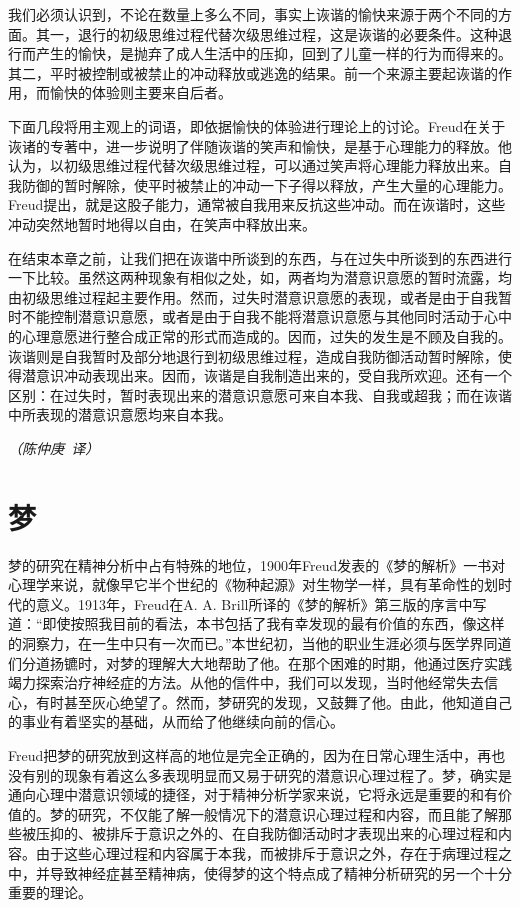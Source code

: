 \documentclass[UTF8,10pt,a4paper,openany]{book}
\newcommand{\signature}[1]{\begin{flushright}\slshape #1\end{flushright}}
\newcommand{\signatureA}{\signature{（陈仲庚~译）}}
\begin{document}
我们必须认识到，不论在数量上多么不同，事实上诙谐的愉快来源于两个不同的方面。其一，退行的初级思维过程代替次级思维过程，这是诙谐的必要条件。这种退行而产生的愉快，是抛弃了成人生活中的压抑，回到了儿童一样的行为而得来的。其二，平时被控制或被禁止的冲动释放或逃逸的结果。前一个来源主要起诙谐的作用，而愉快的体验则主要来自后者。

下面几段将用主观上的词语，即依据愉快的体验进行理论上的讨论。Freud在关于诙诸的专著中，进一步说明了伴随诙谐的笑声和愉快，是基于心理能力的释放。他认为，以初级思维过程代替次级思维过程，可以通过笑声将心理能力释放出来。自我防御的暂时解除，使平时被禁止的冲动一下子得以释放，产生大量的心理能力。Freud提出，就是这股子能力，通常被自我用来反抗这些冲动。而在诙谐时，这些冲动突然地暂时地得以自由，在笑声中释放出来。

在结束本章之前，让我们把在诙谐中所谈到的东西，与在过失中所谈到的东西进行一下比较。虽然这两种现象有相似之处，如，两者均为潜意识意愿的暂时流露，均由初级思维过程起主要作用。然而，过失时潜意识意愿的表现，或者是由于自我暂时不能控制潜意识意愿，或者是由于自我不能将潜意识意愿与其他同时活动于心中的心理意愿进行整合成正常的形式而造成的。因而，过失的发生是不顾及自我的。诙谐则是自我暂时及部分地退行到初级思维过程，造成自我防御活动暂时解除，使得潜意识冲动表现出来。因而，诙谐是自我制造出来的，受自我所欢迎。还有一个区别：在过失时，暂时表现出来的潜意识意愿可来自本我、自我或超我；而在诙谐中所表现的潜意识意愿均来自本我。

\signatureA



\chapter{梦}\label{7}

梦的研究在精神分析中占有特殊的地位，1900年Freud发表的《梦的解析》一书对心理学来说，就像早它半个世纪的《物种起源》对生物学一样，具有革命性的划时代的意义。1913年，Freud在A. A. Brill所译的《梦的解析》第三版的序言中写道：“即使按照我目前的看法，本书包括了我有幸发现的最有价值的东西，像这样的洞察力，在一生中只有一次而已。”本世纪初，当他的职业生涯必须与医学界同道们分道扬镳时，对梦的理解大大地帮助了他。在那个困难的时期，他通过医疗实践竭力探索治疗神经症的方法。从他的信件中，我们可以发现，当时他经常失去信心，有时甚至灰心绝望了。然而，梦研究的发现，又鼓舞了他。由此，他知道自己的事业有着坚实的基础，从而给了他继续向前的信心。

Freud把梦的研究放到这样高的地位是完全正确的，因为在日常心理生活中，再也没有别的现象有着这么多表现明显而又易于研究的潜意识心理过程了。梦，确实是通向心理中潜意识领域的捷径，对于精神分析学家来说，它将永远是重要的和有价值的。梦的研究，不仅能了解一般情况下的潜意识心理过程和内容，而且能了解那些被压抑的、被排斥于意识之外的、在自我防御活动时才表现出来的心理过程和内容。由于这些心理过程和内容属于本我，而被排斥于意识之外，存在于病理过程之中，并导致神经症甚至精神病，使得梦的这个特点成了精神分析研究的另一个十分重要的理论。
\end{document}
